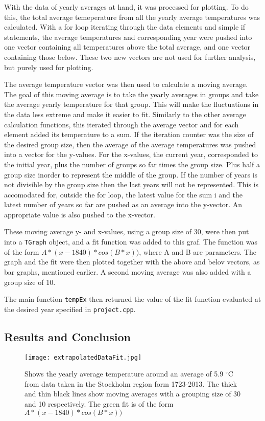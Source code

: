 With the data of yearly averages at hand, it was processed for plotting. To do this, the total average temeperature from all the yearly average temperatures was calculated. With a for loop iterating through the data elements and simple if statements, the average temperatures and corresponding year were pushed into one vector containing all temperatures above the total average, and one vector containing those below. These two new vectors are not used for further analysis, but purely used for plotting.

The average temperature vector was then used to calculate a moving average. The goal of this moving average is to take the yearly averages in groups and take the average yearly temperature for that group. This will make the fluctuations in the data less extreme and make it easier to fit. Similarly to the other average calculation functions, this iterated through the average vector and for each element added its temperature to a sum. If the iteration counter was the size of the desired group size, then the average of the average temperatures was pushed into a vector for the y-values. For the x-values, the current year, corresponded to the initial year, plus the number of groups so far times the group size. Plus half a group size inorder to represent the middle of the group. If the number of years is not divisible by the group size then the last years will not be represented. This is accomodated for, outside the for loop, the latest value for the sum i and the latest number of years so far are pushed as an average into the y-vector. An appropriate value is also pushed to the x-vector.

These moving average y- and x-values, using a group size of 30, were then put into a \texttt{TGraph} object, and a fit function was added to this graf. The function was of the form $A*(x-1840)*cos(B*x))$, where A and B are parameters. The graph and the fit were then plotted together with the above and belov vectors, as bar graphs, mentioned earlier. A second moving average was also added with a group size of 10.

The main function \texttt{tempEx} then returned the value of the fit function evaluated at the desired year specified in \texttt{project.cpp}.

\subsection{Results and Conclusion}

\begin{figure}[h!]
\begin{center}
\texttt{[image: extrapolatedDataFit.jpg]}
\caption{\label{fig:extrap1}Shows the yearly average temperature around an average of 5.9 $^{\circ}$C from data taken in the Stockholm region form 1723-2013. The thick and thin black lines show moving averages with a grouping size of 30 and 10 respectively. The green fit is of the form $A*(x-1840)*cos(B*x))$}
\end{center}
\end{figure}

